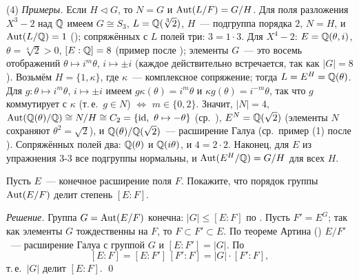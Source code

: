 \begin{remark}
(4) \emph{Примеры.} Если $H\triangleleft G$, то $N=G$ и $\operatorname{Aut}(L/F)=G/H$. Для поля разложения $X^3-2$ над $\mathbb Q$ имеем
$G\cong S_3$, $L=\mathbb Q(\sqrt[3]2)$, $H$~--- подгруппа порядка $2$, $N=H$, и $\operatorname{Aut}(L/\mathbb Q)=1$ (); сопряжённых с $L$ полей три:
$3=1\cdot3$. Для $X^4-2$: $E=\mathbb Q(\theta,i)$, $\theta=\sqrt[4]2>0$, $[E:\mathbb Q]=8$ (пример после ); элементы $G$~--- это восемь отображений $\theta\mapsto i^m\theta$, $i\mapsto\pm i$ (каждое
действительно встречается, так как $|G|=8$). Возьмём $H=\{1,\kappa\}$, где $\kappa$~--- комплексное сопряжение; тогда
$L=E^H=\mathbb Q(\theta)$. Для $g\colon\theta\mapsto i^m\theta$, $i\mapsto\pm i$ имеем $g\kappa(\theta)=i^m\theta$ и
$\kappa g(\theta)=i^{-m}\theta$, так что $g$ коммутирует с $\kappa$ (т.\,е.\ $g\in N$) $\iff$ $m\in\{0,2\}$. Значит,
$|N|=4$, $\Aut(\Q(\theta)/\Q)\cong N/H\cong C_2=\{\id,\ \theta\mapsto-\theta\}$ (ср.\ ), $E^N=\mathbb Q(\sqrt2)$ (элементы $N$ сохраняют
$\theta^2=\sqrt2$), и $\mathbb Q(\theta)/\mathbb Q(\sqrt2)$~--- расширение Галуа (ср.\ пример (1) после ). Сопряжённых полей два:
$\mathbb Q(\theta)$ и $\mathbb Q(i\theta)$, и $4=2\cdot2$. Наконец, для $E$ из упражнения 3-3 все подгруппы нормальны, и
$\operatorname{Aut}(E^H/\mathbb Q)=G/H$ для всех $H$.
\end{remark}

\begin{exercise}[3-5]
Пусть $E$~--- конечное расширение поля $F$. Покажите, что порядок группы $\operatorname{Aut}(E/F)$ делит степень $[E:F]$.
\end{exercise}

\noindent\emph{Решение.} Группа $G=\operatorname{Aut}(E/F)$ конечна: $|G|\le[E:F]$ по . Пусть $F'=E^G$; так как элементы $G$
тождественны на $F$, то $F\subset F'\subset E$. По теореме Артина () $E/F'$~--- расширение Галуа с группой $G$ и
$[E:F']=|G|$. По 
\[
[E:F]=[E:F']\,[F':F]=|G|\cdot[F':F],
\]
т.\,е.\ $|G|$ делит $[E:F]$. \qed

\begin{center}
\begin{keepfig}
\centering
{}
\end{keepfig}
\end{center}

